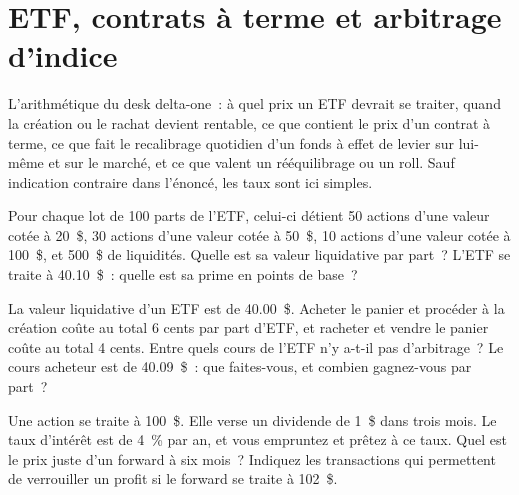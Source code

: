 \chapter{ETF, contrats à terme et arbitrage d'indice}\label{ch:iv2:etfs-futures-and-index-arbitrage}

\begin{ivtrains}
L'arithmétique du desk delta-one~: à quel prix un ETF devrait se traiter, quand la création ou le rachat devient rentable, ce que contient le prix d'un contrat à terme, ce que fait le recalibrage quotidien d'un fonds à effet de levier sur lui-même et sur le marché, et ce que valent un rééquilibrage ou un roll. Sauf indication contraire dans l'énoncé, les taux sont ici simples.
\end{ivtrains}

\begin{question}\label{iq:iv2:etfs-futures-and-index-arbitrage:1}
Pour chaque lot de 100 parts de l'ETF, celui-ci détient 50 actions d'une valeur cotée à 20~\$, 30 actions d'une valeur cotée à 50~\$, 10 actions d'une valeur cotée à 100~\$, et 500~\$ de liquidités. Quelle est sa valeur liquidative par part~? L'ETF se traite à 40.10~\$~: quelle est sa prime en points de base~?
\end{question}

\begin{question}\label{iq:iv2:etfs-futures-and-index-arbitrage:2}
La valeur liquidative d'un ETF est de 40.00~\$. Acheter le panier et procéder à la création coûte au total 6 cents par part d'ETF, et racheter et vendre le panier coûte au total 4 cents. Entre quels cours de l'ETF n'y a-t-il pas d'arbitrage~? Le cours acheteur est de 40.09~\$~: que faites-vous, et combien gagnez-vous par part~?
\end{question}

\begin{question}\label{iq:iv2:etfs-futures-and-index-arbitrage:3}
Une action se traite à 100~\$. Elle verse un dividende de 1~\$ dans trois mois. Le taux d'intérêt est de 4~\% par an, et vous empruntez et prêtez à ce taux. Quel est le prix juste d'un forward à six mois~? Indiquez les transactions qui permettent de verrouiller un profit si le forward se traite à 102~\$.
\end{question}

